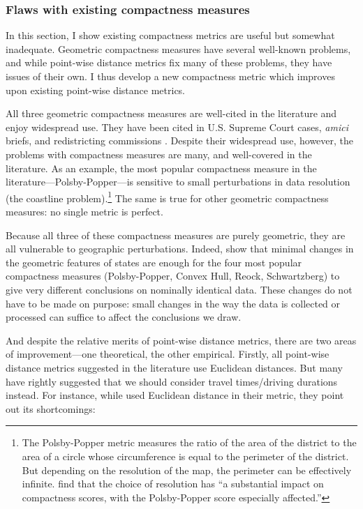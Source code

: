 \documentclass[]{article}
\begin{document}
\hypertarget{flaws-with-existing-compactness-measures}{%
\subsubsection{Flaws with existing compactness
measures}\label{flaws-with-existing-compactness-measures}}

In this section, I show existing compactness metrics are useful but
somewhat inadequate. Geometric compactness measures have several
well-known problems, and while point-wise distance metrics fix many of
these problems, they have issues of their own. I thus develop a new
compactness metric which improves upon existing point-wise distance
metrics.

All three geometric compactness measures are well-cited in the
literature and enjoy widespread use. They have been cited in U.S.
Supreme Court cases, \emph{amici} briefs, and redistricting commissions
\citep{moncrief2011}. Despite their widespread use, however, the
problems with compactness measures are many, and well-covered in the
literature. As an example, the most popular compactness measure in the
literature---Polsby-Popper---is sensitive to small perturbations in data
resolution (the coastline problem).\footnote{The Polsby-Popper metric
  measures the ratio of the area of the district to the area of a circle
  whose circumference is equal to the perimeter of the district. But
  depending on the resolution of the map, the perimeter can be
  effectively infinite. \citeauthor{bswp} find that the choice of
  resolution has ``a substantial impact on compactness scores, with the
  Polsby-Popper score especially affected.''} The same is true for other
geometric compactness measures: no single metric is perfect.

Because all three of these compactness measures are purely geometric,
they are all vulnerable to geographic perturbations. Indeed, \cite{bswp}
show that minimal changes in the geometric features of states are enough
for the four most popular compactness measures (Polsby-Popper, Convex
Hull, Reock, Schwartzberg) to give very different conclusions on
nominally identical data. These changes do not have to be made on
purpose: small changes in the way the data is collected or processed can
suffice to affect the conclusions we draw.

And despite the relative merits of point-wise distance metrics, there
are two areas of improvement---one theoretical, the other empirical.
Firstly, all point-wise distance metrics suggested in the literature use
Euclidean distances. But many have rightly suggested that we should
consider travel times/driving durations instead. For instance, while
\cite{fh2011} used Euclidean distance in their metric, they point out
its shortcomings:
\end{document}
